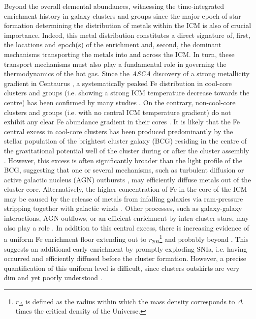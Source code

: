 \documentclass{aa}
\begin{document}
Beyond the overall elemental abundances, witnessing the time-integrated enrichment history in galaxy clusters and groups since the major epoch of star formation \citep[$z \simeq 2$--3; for a review, see][]{2014ARA&A..52..415M} determining the distribution of metals within the ICM is also of crucial importance. Indeed, this metal distribution constitutes a direct signature of, first, the locations and epoch(s) of the enrichment and, second,  the dominant mechanisms transporting the metals into and across the ICM. In turn, these transport mechanisms must also play a fundamental role in governing the thermodynamics of the hot gas. Since the \textit{ASCA} discovery of a strong metallicity gradient in Centaurus \citep{1994MNRAS.269..409A,1994PASJ...46L..55F}, a systematically peaked Fe distribution in cool-core clusters  and groups (i.e. showing a strong ICM temperature decrease towards the centre) has been confirmed by many studies \citep[e.g.][]{1997ApJ...488L.125M,2001ApJ...551..153D,2002ApJ...572..160G,2016A&A...592A..37T}. On the contrary, non-cool-core clusters and groups (i.e. with no central ICM temperature gradient) do not exhibit any clear Fe abundance gradient in their cores \citep{2001ApJ...551..153D}. It is likely that the Fe central excess in cool-core clusters has been produced predominantly by the stellar population of the brightest cluster galaxy (BCG) residing in the centre of the gravitational potential well of the cluster during or after the cluster
assembly \citep{2004A&A...416L..21B,2004A&A...419....7D}. However, this excess is often significantly broader than the light profile of the BCG, suggesting that one or several mechanisms, such as turbulent diffusion \citep{2005MNRAS.359.1041R,2006MNRAS.372.1840R} or active galactic nucleus (AGN) outbursts \citep[e.g.][]{2010ApJ...717..937G}, may efficiently diffuse metals out of the cluster core. Alternatively, the higher concentration of Fe in the core of the ICM may be caused by the release of metals from infalling galaxies via ram-pressure stripping \citep[][]{2006A&A...452..795D} together with galactic winds \citep{2007A&A...466..813K,2009A&A...504..719K}. Other processes, such as galaxy-galaxy interactions, AGN outflows, or an efficient enrichment by intra-cluster stars, may also play a role \citep[for a review, see][]{2008SSRv..134..363S}. In addition to this central excess, there is increasing evidence of a uniform Fe enrichment floor extending out to $r_{200}$\footnote{$r_\Delta$ is defined as the radius within which the mass density corresponds to $\Delta$ times the critical density of the Universe.} and probably beyond \citep{2008PASJ...60S.343F,2013Natur.502..656W,2016A&A...592A..37T}. This suggests an additional early enrichment by promptly exploding SNIa, i.e. having occurred and efficiently diffused before the cluster formation. However, a precise quantification of this uniform level is difficult, since clusters outskirts are very dim and yet poorly understood \citep{2016A&A...586A..32M}.
\end{document}
